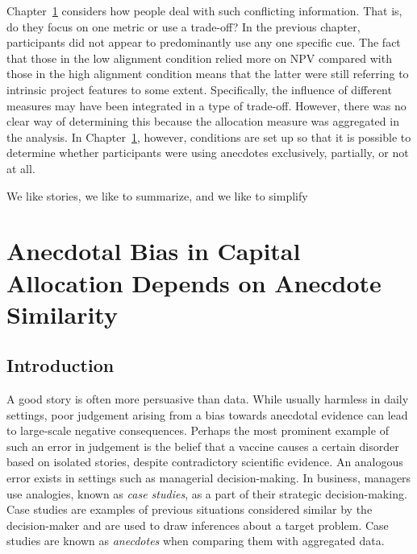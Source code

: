 \documentclass[a4paper, nobind]{templates/ociamthesis}
\theoremstyle{definition}
\theoremstyle{definition}
\theoremstyle{definition}
\theoremstyle{definition}
\theoremstyle{remark}
\begin{document}
Chapter~\ref{anecdotes} considers how people deal with such conflicting
information. That is, do they focus on one metric or use a trade-off? In the
previous chapter, participants did not appear to predominantly use any one
specific cue. The fact that those in the low alignment condition relied more on
NPV compared with those in the high alignment condition means that the latter
were still referring to intrinsic project features to some extent. Specifically,
the influence of different measures may have been integrated in a type of
trade-off. However, there was no clear way of determining this because the
allocation measure was aggregated in the analysis. In Chapter~\ref{anecdotes},
however, conditions are set up so that it is possible to determine whether
participants were using anecdotes exclusively, partially, or not at all.



\begin{savequote}
We like stories, we like to summarize, and we like to simplify
\end{savequote}

\hypertarget{anecdotes}{%
\chapter{Anecdotal Bias in Capital Allocation Depends on Anecdote Similarity}\label{anecdotes}}

\minitoc

\section{Introduction}

A good story is often more persuasive than data. While usually harmless in daily
settings, poor judgement arising from a bias towards anecdotal evidence can lead
to large-scale negative consequences. Perhaps the most prominent example of such
an error in judgement is the belief that a vaccine causes a certain disorder
based on isolated stories, despite contradictory scientific evidence. An
analogous error exists in settings such as managerial decision-making. In
business, managers use analogies, known as \emph{case studies}, as a part of their
strategic decision-making. Case studies are examples of previous situations
considered similar by the decision-maker and are used to draw inferences about a
target problem. Case studies are known as \emph{anecdotes} when comparing them with
aggregated data.
\end{document}
